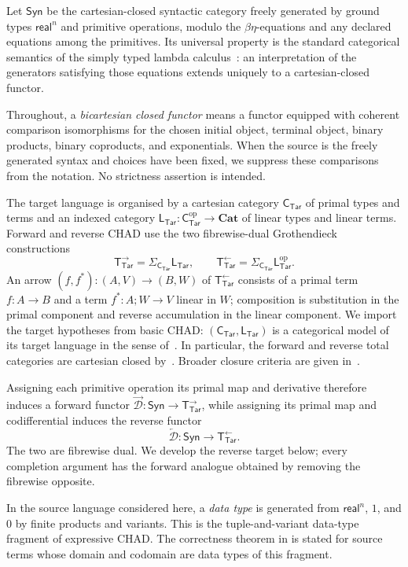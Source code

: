 \documentclass[runningheads,envcountsame]{llncs}
\newcommand{\Cat}{\mathbf{Cat}}
\newcommand{\Syn}{\mathsf{Syn}}
\newcommand{\Tar}{\mathsf{Tar}}
\newcommand{\CTar}{\mathsf C_{\Tar}}
\newcommand{\LTar}{\mathsf L_{\Tar}}
\newcommand{\TotTar}{\mathsf T_{\Tar}^{\leftarrow}}
\newcommand{\TotTarFwd}{\mathsf T_{\Tar}^{\rightarrow}}
\begin{document}
Let $\Syn$ be the cartesian-closed syntactic category freely generated by ground types $\mathsf{real}^n$ and primitive operations, modulo the $\beta\eta$-equations and any declared equations among the primitives. Its universal property is the standard categorical semantics of the simply typed lambda calculus~\cite{Curien1986,LambekScott1986}: an interpretation of the generators satisfying those equations extends uniquely to a cartesian-closed functor.

Throughout, a \emph{bicartesian closed functor} means a functor equipped
with coherent comparison isomorphisms for the chosen initial object, terminal
object, binary products, binary coproducts, and exponentials. When the source
is the freely generated syntax and choices have been fixed, we suppress these
comparisons from the notation. No strictness assertion is intended.

The target language is organised by a cartesian category $\CTar$ of primal types and terms and an indexed category
$\LTar:\CTar^{\mathrm{op}}\longrightarrow\Cat$
of linear types and linear terms. Forward and reverse CHAD use the two fibrewise-dual Grothendieck constructions
$$
\TotTarFwd=\Sigma_{\CTar}\LTar,
\qquad
\TotTar=\Sigma_{\CTar}\LTar^{\mathrm{op}}.
$$
An arrow $(f,f^*):(A,V)\to(B,W)$ of $\TotTar$ consists of a primal term $f:A\to B$ and a term $f^*:A;W\to V$ linear in $W$; composition is substitution in the primal component and reverse accumulation in the linear component. We import the target hypotheses from basic CHAD: $(\CTar,\LTar)$ is a categorical model of its target language in the sense of~\cite[Definition~5.5]{VakarSmeding2022}. In particular, the forward and reverse total categories are cartesian closed by~\cite[Theorems~6.1 and~6.2]{VakarSmeding2022}. Broader closure criteria are given in~\cite{LucatelliNunesVakar2025Monoidal}.

Assigning each primitive operation its primal map and derivative therefore induces a forward functor $\overrightarrow{\mathcal D}:\Syn\to\TotTarFwd$, while assigning its primal map and codifferential induces the reverse functor
$$
\overleftarrow{\mathcal D}:\Syn\longrightarrow\TotTar.
$$
The two are fibrewise dual. We develop the reverse target below; every completion argument has the forward analogue obtained by removing the fibrewise opposite.

In the source language considered here, a \emph{data type} is generated from $\mathsf{real}^n$, $1$, and $0$ by finite products and variants. This is the tuple-and-variant data-type fragment of expressive CHAD\@. The correctness theorem in  is stated for source terms whose domain and codomain are data types of this fragment.
\end{document}

